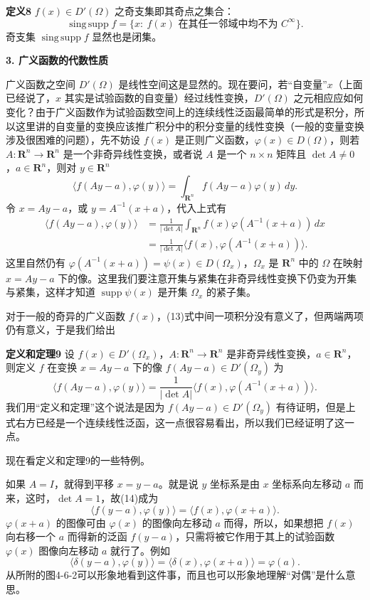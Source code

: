 \noindent\textbf{定义8}
$f(x)\in D'(\Omega)$ 之奇支集即其奇点之集合：
\[
 \operatorname{sing\,supp}f=\{x:\ f(x)\text{ 在其任一邻域中均不为 }C^\infty\}.
\]
奇支集 $\operatorname{sing\,supp}f$ 显然也是闭集。

\medskip
\noindent\textbf{3. 广义函数的代数性质}

广义函数之空间 $D'(\Omega)$ 是线性空间这是显然的。现在要问，若“自变量”$x$（上面已经说了，$x$ 其实是试验函数的自变量）经过线性变换，$D'(\Omega)$ 之元相应应如何变化？由于广义函数作为试验函数空间上的连续线性泛函最简单的形式是积分，所以这里讲的自变量的变换应该推广积分中的积分变量的线性变换（一般的变量变换涉及很困难的问题），先不妨设 $f(x)$ 是正则广义函数，$\varphi(x)\in D(\Omega)$，则若 $A:\mathbf R^n\to\mathbf R^n$ 是一个非奇异线性变换，或者说 $A$ 是一个 $n\times n$ 矩阵且 $\det A\ne0$，$a\in\mathbf R^n$，则对 $y\in\mathbf R^n$
\[
 \langle f(Ay-a),\varphi(y)\rangle
 =\int_{\mathbf R^n}f(Ay-a)\varphi(y)\,dy.
\]
令 $x=Ay-a$，或 $y=A^{-1}(x+a)$，代入上式有
\begin{equation}
\begin{aligned}
 \langle f(Ay-a),\varphi(y)\rangle
 &=\frac1{|\det A|}\int_{\mathbf R^n}f(x)\varphi(A^{-1}(x+a))\,dx\\
 &=\frac1{|\det A|}\langle f(x),\varphi(A^{-1}(x+a))\rangle.
\end{aligned}
\tag{13}
\end{equation}
这里自然仍有 $\varphi(A^{-1}(x+a))=\psi(x)\in D(\Omega_x)$，$\Omega_x$ 是 $\mathbf R^n$ 中的 $\Omega$ 在映射 $x=Ay-a$ 下的像。这里我们要注意开集与紧集在非奇异线性变换下仍变为开集与紧集，这样才知道 $\operatorname{supp}\psi(x)$ 是开集 $\Omega_x$ 的紧子集。

对于一般的奇异的广义函数 $f(x)$，(13)式中间一项积分没有意义了，但两端两项仍有意义，于是我们给出

\noindent\textbf{定义和定理9}
设 $f(x)\in D'(\Omega_x)$，$A:\mathbf R^n\to\mathbf R^n$ 是非奇异线性变换，$a\in\mathbf R^n$，则定义 $f$ 在变换 $x=Ay-a$ 下的像 $f(Ay-a)\in D'(\Omega_y)$ 为
\begin{equation}
 \langle f(Ay-a),\varphi(y)\rangle
 =\frac1{|\det A|}\langle f(x),\varphi(A^{-1}(x+a))\rangle.
 \tag{14}
\end{equation}
我们用“定义和定理”这个说法是因为 $f(Ay-a)\in D'(\Omega_y)$ 有待证明，但是上式右方已经是一个连续线性泛函，这一点很容易看出，所以我们已经证明了这一点。

现在看定义和定理9的一些特例。

如果 $A=I$，就得到平移 $x=y-a$。就是说 $y$ 坐标系是由 $x$ 坐标系向左移动 $a$ 而来，这时，$\det A=1$，故(14)成为
\[
 \langle f(y-a),\varphi(y)\rangle=\langle f(x),\varphi(x+a)\rangle.
\]
$\varphi(x+a)$ 的图像可由 $\varphi(x)$ 的图像向左移动 $a$ 而得，所以，如果想把 $f(x)$ 向右移一个 $a$ 而得新的泛函 $f(y-a)$，只需将被它作用于其上的试验函数 $\varphi(x)$ 图像向左移动 $a$ 就行了。例如
\[
 \langle\delta(y-a),\varphi(y)\rangle
 =\langle\delta(x),\varphi(x+a)\rangle=\varphi(a).
\]
从所附的图4-6-2可以形象地看到这件事，而且也可以形象地理解“对偶”是什么意思。

